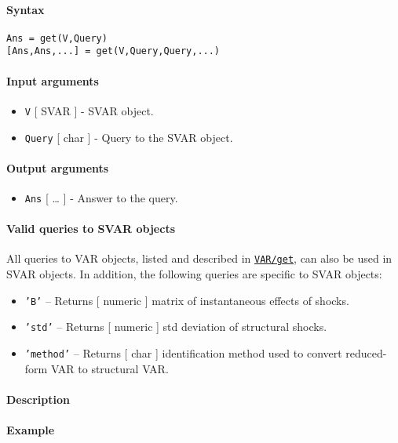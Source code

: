 


	\paragraph{Syntax}\label{syntax}

\begin{verbatim}
Ans = get(V,Query)
[Ans,Ans,...] = get(V,Query,Query,...)
\end{verbatim}

\paragraph{Input arguments}\label{input-arguments}

\begin{itemize}
\item
  \texttt{V} {[} SVAR {]} - SVAR object.
\item
  \texttt{Query} {[} char {]} - Query to the SVAR object.
\end{itemize}

\paragraph{Output arguments}\label{output-arguments}

\begin{itemize}
\itemsep1pt\parskip0pt
\item
  \texttt{Ans} {[} \ldots{} {]} - Answer to the query.
\end{itemize}

\paragraph{Valid queries to SVAR
objects}\label{valid-queries-to-svar-objects}

All queries to VAR objects, listed and described in
\href{VAR/get}{\texttt{VAR/get}}, can also be used in SVAR objects. In
addition, the following queries are specific to SVAR objects:

\begin{itemize}
\item
  \texttt{'B'} -- Returns {[} numeric {]} matrix of instantaneous
  effects of shocks.
\item
  \texttt{'std'} -- Returns {[} numeric {]} std deviation of structural
  shocks.
\item
  \texttt{'method'} -- Returns {[} char {]} identification method used
  to convert reduced-form VAR to structural VAR.
\end{itemize}

\paragraph{Description}\label{description}

\paragraph{Example}\label{example}


